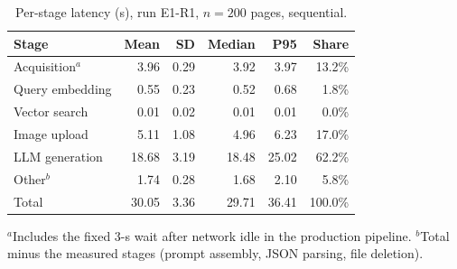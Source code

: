 \begin{table}[ht]
\centering
\caption{Per-stage latency (s), run E1-R1, $n=200$ pages, sequential.}
\begin{tabular}{lrrrrr}
\toprule
Stage & Mean & SD & Median & P95 & Share \\
\midrule
Acquisition$^{a}$ & 3.96 & 0.29 & 3.92 & 3.97 & 13.2\% \\
Query embedding & 0.55 & 0.23 & 0.52 & 0.68 & 1.8\% \\
Vector search & 0.01 & 0.02 & 0.01 & 0.01 & 0.0\% \\
Image upload & 5.11 & 1.08 & 4.96 & 6.23 & 17.0\% \\
LLM generation & 18.68 & 3.19 & 18.48 & 25.02 & 62.2\% \\
Other$^{b}$ & 1.74 & 0.28 & 1.68 & 2.10 & 5.8\% \\
\midrule
Total & 30.05 & 3.36 & 29.71 & 36.41 & 100.0\% \\
\bottomrule
\end{tabular}

\vspace{2pt}\footnotesize $^{a}$Includes the fixed 3-s wait after network idle in the production pipeline. $^{b}$Total minus the measured stages (prompt assembly, JSON parsing, file deletion).
\end{table}
